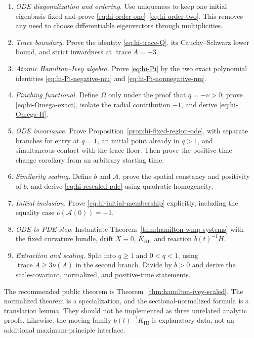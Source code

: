 \documentclass[10pt]{coll-l}
\newcommand{\trace}{\operatorname{trace}}
\theoremstyle{definition}
\theoremstyle{remark}
\numberwithin{section}{chapter}
\numberwithin{equation}{chapter}
\begin{document}
\begin{enumerate}
\item \emph{ODE diagonalization and ordering.}
      Use uniqueness to keep one initial eigenbasis fixed and prove
      \eqref{eq:hi-order-one}--\eqref{eq:hi-order-two}.  This removes any
      need to choose differentiable eigenvectors through multiplicities.
\item \emph{Trace boundary.}
      Prove the identity \eqref{eq:hi-trace-Q}, its Cauchy--Schwarz lower
      bound, and strict inwardness at $\trace A=-3$.
\item \emph{Atomic Hamilton--Ivey algebra.}
      Prove \eqref{eq:hi-Pi} by the two exact polynomial identities
      \eqref{eq:hi-Pi-negative-mu} and
      \eqref{eq:hi-Pi-nonnegative-mu}.
\item \emph{Pinching functional.}
      Define $\Omega$ only under the proof that $q=-\nu>0$; prove
      \eqref{eq:hi-Omega-exact}, isolate the radial contribution $-1$, and
      derive \eqref{eq:hi-Omega-H}.
\item \emph{ODE invariance.}
      Prove Proposition~\ref{prop:hi-fixed-region-ode}, with separate
      branches for entry at $q=1$, an initial point already in $q>1$, and
      simultaneous contact with the trace floor.  Then prove the positive
      time-change corollary from an arbitrary starting time.
\item \emph{Similarity scaling.}
      Define $b$ and $\mathcal A$, prove the spatial constancy and
      positivity of $b$, and derive \eqref{eq:hi-rescaled-pde} using
      quadratic homogeneity.
\item \emph{Initial inclusion.}
      Prove \eqref{eq:hi-initial-membership} explicitly, including the
      equality case $\nu(\mathcal A(0))=-1$.
\item \emph{ODE-to-PDE step.}
      Instantiate Theorem~\ref{thm:hamilton-wmp-systems} with the fixed
      curvature bundle, drift $X\equiv0$, $K_{\mathrm{HI}}$, and reaction
      $b(t)^{-1}H$.
\item \emph{Extraction and scaling.}
      Split into $q\geq1$ and $0<q<1$, using
      $\trace A\geq3\nu(A)$ in the second branch.  Divide by $b>0$ and
      derive the scale-covariant, normalized, and positive-time statements.
\end{enumerate}

The recommended public theorem is
Theorem~\ref{thm:hamilton-ivey-scaled}.  The normalized theorem is a
specialization, and the sectional-normalized formula is a translation
lemma.  They should not be implemented as three unrelated analytic proofs.
Likewise, the moving family $b(t)^{-1}K_{\mathrm{HI}}$ is explanatory data,
not an additional maximum-principle interface.
\end{document}
